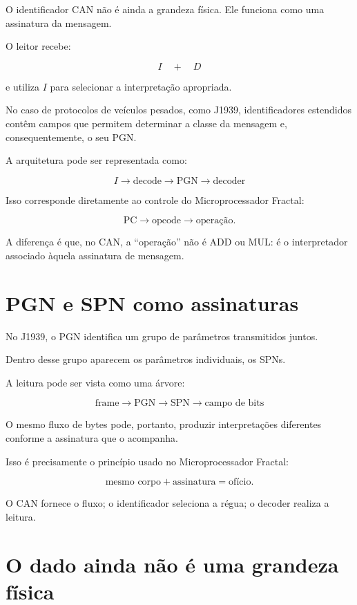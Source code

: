 \documentclass[11pt,a4paper]{article}
\begin{document}
O identificador CAN não é ainda a grandeza física. Ele funciona como uma assinatura
da mensagem.

O leitor recebe:

\[
I \quad+\quad D
\]

e utiliza $I$ para selecionar a interpretação apropriada.

No caso de protocolos de veículos pesados, como J1939, identificadores estendidos
contêm campos que permitem determinar a classe da mensagem e, consequentemente,
o seu PGN.

A arquitetura pode ser representada como:

\[
\boxed{
I
\rightarrow
\mathrm{decode}
\rightarrow
\mathrm{PGN}
\rightarrow
\mathrm{decoder}
}
\]

Isso corresponde diretamente ao controle do Microprocessador Fractal:

\[
\text{PC}
\rightarrow
\text{opcode}
\rightarrow
\text{operação}.
\]

A diferença é que, no CAN, a ``operação'' não é ADD ou MUL: é o interpretador
associado àquela assinatura de mensagem.


\section{PGN e SPN como assinaturas}

No J1939, o PGN identifica um grupo de parâmetros transmitidos juntos.

Dentro desse grupo aparecem os parâmetros individuais, os SPNs.

A leitura pode ser vista como uma árvore:

\[
\boxed{
\text{frame}
\rightarrow
\text{PGN}
\rightarrow
\text{SPN}
\rightarrow
\text{campo de bits}
}
\]

O mesmo fluxo de bytes pode, portanto, produzir interpretações diferentes conforme
a assinatura que o acompanha.

Isso é precisamente o princípio usado no Microprocessador Fractal:

\[
\text{mesmo corpo}
+
\text{assinatura}
=
\text{ofício}.
\]

O CAN fornece o fluxo; o identificador seleciona a régua; o decoder realiza a leitura.


\section{O dado ainda não é uma grandeza física}
\end{document}
